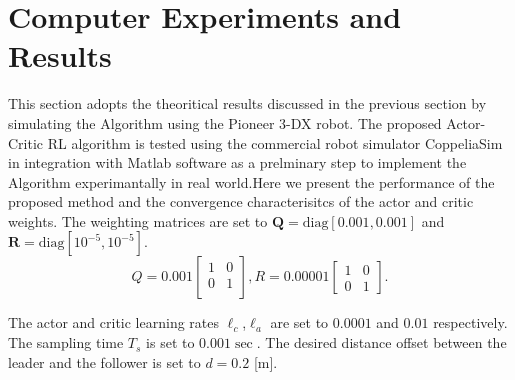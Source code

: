 \documentclass[conference]{IEEEtran}
\begin{document}
    


  

 \section{Computer Experiments and Results}
 \label{sec:resultsExperiments}
 This section adopts the theoritical results discussed in the previous section by simulating the Algorithm using the Pioneer 3-DX  robot. The proposed Actor-Critic RL algorithm is tested using the commercial robot simulator CoppeliaSim in integration with Matlab software as a prelminary step to implement the Algorithm experimantally in real world.Here we present the performance of the proposed method and the convergence characterisitcs of the actor and critic weights. The weighting matrices are set to $\mathbf{Q} = \mathrm{diag}[0.001,0.001]$ and $\mathbf{R} = \mathrm{diag}[10^{-5}, 10^{-5}].$ %
  \[Q=0.001 
  \begin{bmatrix}
  1       & 0   \\
  0       & 1   \\
  \end{bmatrix},
  R=0.00001
  \begin{bmatrix}
  1       & 0 \\
  0       & 1 
  \end{bmatrix}.\]
  
  
 The actor and critic learning rates $\ell_c$,$\ell_a$ are set to  $0.0001$ and $0.01$ respectively. The sampling time $T_s$ is set to $0.001 \sec.$ The desired distance offset between the leader and the follower is set to $ d = 0.2$ [m].
\end{document}
